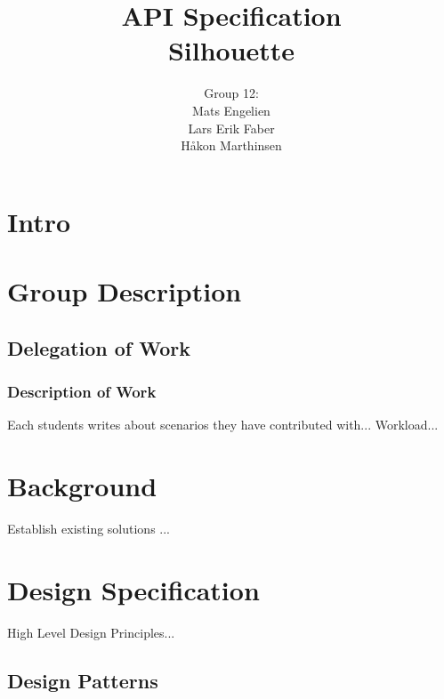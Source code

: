 \documentclass[12pt]{article}
\begin{document}
\title{%
    API Specification\\
    \large Silhouette}
\author{%
    Group 12:\\
    Mats Engelien\\
    Lars Erik Faber\\
    Håkon Marthinsen}
\date{}
\maketitle

\newpage

\tableofcontents

\newpage

\section{Intro}

\section{Group Description}

\subsection{Delegation of Work}

\subsubsection{Description of Work}
Each students writes about scenarios they have contributed with...
Workload...

\section{Background}
Establish existing solutions ...

\section{Design Specification}
High Level Design Principles...

\subsection{Design Patterns}
\end{document}

